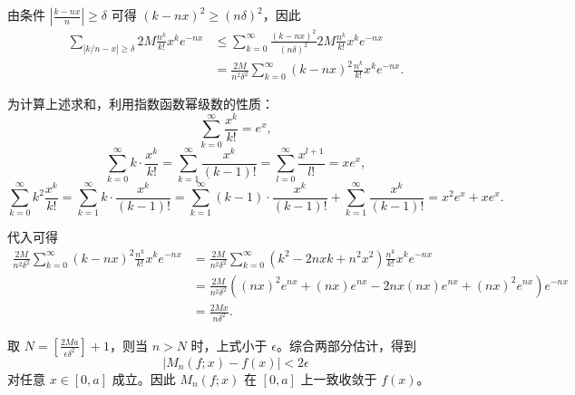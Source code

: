 由条件 $|\frac{k-nx}{n}| \geq \delta$ 可得 $(k-nx)^2 \geq (n\delta)^2$，因此
\begin{align*}
\sum_{|k/n - x| \geq \delta} 2M \frac{n^k}{k!} x^k e^{-nx}
&\leq \sum_{k=0}^{\infty} \frac{(k-nx)^2}{(n\delta)^2} 2M \frac{n^k}{k!} x^k e^{-nx} \\
&= \frac{2M}{n^2\delta^2} \sum_{k=0}^{\infty} (k-nx)^2 \frac{n^k}{k!} x^k e^{-nx}.
\end{align*}

为计算上述求和，利用指数函数幂级数的性质：
\[
\sum_{k=0}^{\infty} \frac{x^k}{k!} = e^x,
\]
\[
\sum_{k=0}^{\infty} k \cdot \frac{x^k}{k!}
= \sum_{k=1}^{\infty} \frac{x^k}{(k-1)!}
= \sum_{l=0}^{\infty} \frac{x^{l+1}}{l!}
= x e^{x},
\]
\[
\sum_{k=0}^{\infty} k^2 \frac{x^k}{k!}
= \sum_{k=1}^{\infty} k \cdot \frac{x^k}{(k-1)!}
= \sum_{k=1}^{\infty} (k-1) \cdot \frac{x^k}{(k-1)!} + \sum_{k=1}^{\infty} \frac{x^k}{(k-1)!}
= x^2 e^x + x e^x.
\]

代入可得
\begin{align*}
\frac{2M}{n^2\delta^2} \sum_{k=0}^{\infty} (k-nx)^2 \frac{n^k}{k!} x^k e^{-nx}
&= \frac{2M}{n^2\delta^2} \sum_{k=0}^{\infty} (k^2 - 2nxk + n^2x^2) \frac{n^k}{k!} x^k e^{-nx} \\
&= \frac{2M}{n^2\delta^2} \left( (nx)^2 e^{nx} + (nx) e^{nx} - 2nx(nx) e^{nx} + (nx)^2 e^{nx} \right) e^{-nx} \\
&= \frac{2Mx}{n\delta^2}.
\end{align*}

取 $N = \left[\frac{2Ma}{\epsilon \delta^2}\right]+1$，则当 $n > N$ 时，上式小于 $\epsilon$。综合两部分估计，得到
\[
|M_n(f;x)-f(x)| < 2\epsilon
\]
对任意 $x \in [0,a]$ 成立。因此 $M_n(f;x)$ 在 $[0,a]$ 上一致收敛于 $f(x)$。
